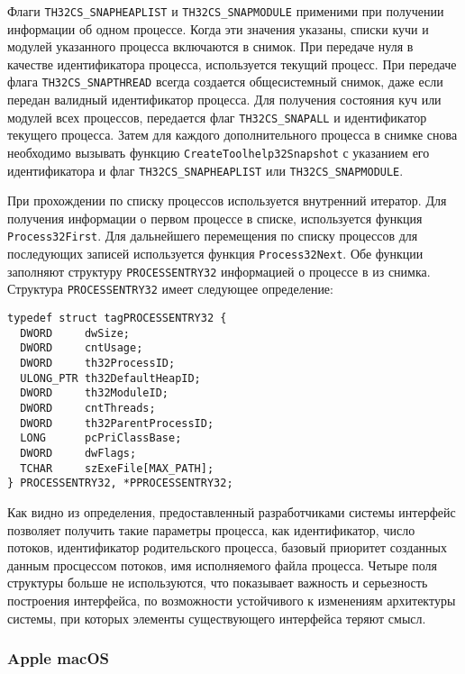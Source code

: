 Флаги \texttt{TH32CS\_SNAPHEAPLIST} и \texttt{TH32CS\_SNAPMODULE} применими при
получении информации об одном процессе. Когда эти значения указаны, списки кучи
и модулей указанного процесса включаются в снимок. При передаче нуля в качестве
идентификатора процесса, используется текущий процесс. При передаче флага
\texttt{TH32CS\_SNAPTHREAD} всегда создается общесистемный снимок, даже если
передан валидный идентификатор процесса.
Для получения состояния куч или модулей всех процессов, передается флаг
\texttt{TH32CS\_SNAPALL} и идентификатор текущего процесса. Затем для каждого
дополнительного процесса в снимке снова необходимо вызывать функцию
\texttt{CreateToolhelp32Snapshot} с указанием его идентификатора и флаг
\texttt{TH32CS\_SNAPHEAPLIST} или \texttt{TH32CS\_SNAPMODULE}.

При прохождении по списку процессов используется внутренний итератор. Для
получения информации о первом процессе в списке, используется функция
\texttt{Process32First}. Для дальнейшего перемещения по списку процессов для
последующих записей используется функция \texttt{Process32Next}. Обе функции
заполняют структуру \texttt{PROCESSENTRY32} информацией о процессе в из снимка.
Структура \texttt{PROCESSENTRY32} имеет следующее определение:

\medskip
\begin{lstlisting}[style=cstyle]
typedef struct tagPROCESSENTRY32 {
  DWORD     dwSize;
  DWORD     cntUsage;
  DWORD     th32ProcessID;
  ULONG_PTR th32DefaultHeapID;
  DWORD     th32ModuleID;
  DWORD     cntThreads;
  DWORD     th32ParentProcessID;
  LONG      pcPriClassBase;
  DWORD     dwFlags;
  TCHAR     szExeFile[MAX_PATH];
} PROCESSENTRY32, *PPROCESSENTRY32;
\end{lstlisting}
\medskip

Как видно из определения, предоставленный разработчиками системы интерфейс
позволяет получить такие параметры процесса, как идентификатор, число потоков,
идентификатор родительского процесса, базовый приоритет созданных данным
просцессом потоков, имя исполняемого файла процесса. Четыре поля структуры
больше не используются, что показывает важность и серьезность построения
интерфейса, по возможности устойчивого к изменениям архитектуры системы, при
которых элементы существующего интерфейса теряют смысл.

\subsubsection{Apple macOS}
\label{sub:domain:analogs:macos}

